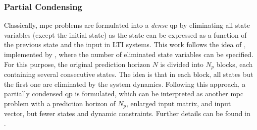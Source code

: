 \subsubsection{Partial Condensing}
Classically, \gls{mpc} problems are formulated into a \textit{dense} \gls{qp} by eliminating all state variables (except the initial state) as the state can be expressed as a function of the previous state and the input in LTI systems.
This work follows the idea of \cite{axehill_controlling_2015}, implemented by \cite{frison_efficient_2016}, where the number of eliminated state variables can be specified.
For this purpose, the original prediction horizon $N$ is divided into $N_p$ blocks, each containing several consecutive states.
The idea is that in each block, all states but the first one are eliminated by the system dynamics. 
Following this approach, a partially condensed \gls{qp} is formulated, which can be interpreted as another \gls{mpc} problem with a prediction horizon of $N_p$, enlarged input matrix, and input vector, but fewer states and dynamic constraints.
Further details can be found in \cite{frison_efficient_2016}.

